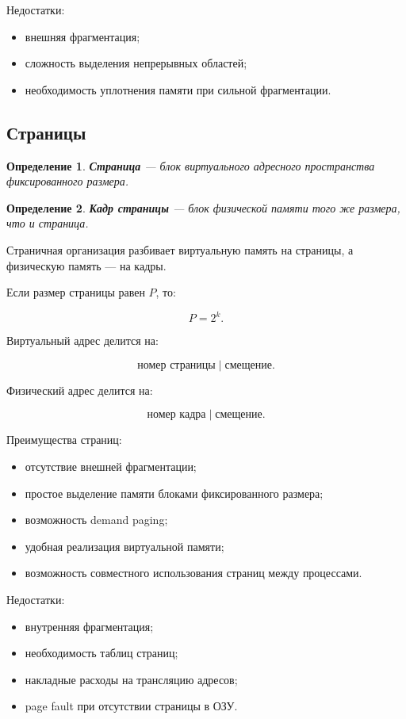 \documentclass[a4paper,12pt]{article}
\newtheorem{definition}{Определение}
\begin{document}
Недостатки:

\begin{itemize}
    \item внешняя фрагментация;
    \item сложность выделения непрерывных областей;
    \item необходимость уплотнения памяти при сильной фрагментации.
\end{itemize}

\subsection{Страницы}

\begin{definition}
\textbf{Страница} --- блок виртуального адресного пространства фиксированного размера.
\end{definition}

\begin{definition}
\textbf{Кадр страницы} --- блок физической памяти того же размера, что и страница.
\end{definition}

Страничная организация разбивает виртуальную память на страницы, а физическую память --- на кадры.

Если размер страницы равен $P$, то:

\[
P = 2^k.
\]

Виртуальный адрес делится на:

\[
\text{номер страницы} \;|\; \text{смещение}.
\]

Физический адрес делится на:

\[
\text{номер кадра} \;|\; \text{смещение}.
\]

Преимущества страниц:

\begin{itemize}
    \item отсутствие внешней фрагментации;
    \item простое выделение памяти блоками фиксированного размера;
    \item возможность demand paging;
    \item удобная реализация виртуальной памяти;
    \item возможность совместного использования страниц между процессами.
\end{itemize}

Недостатки:

\begin{itemize}
    \item внутренняя фрагментация;
    \item необходимость таблиц страниц;
    \item накладные расходы на трансляцию адресов;
    \item page fault при отсутствии страницы в ОЗУ.
\end{itemize}
\end{document}
